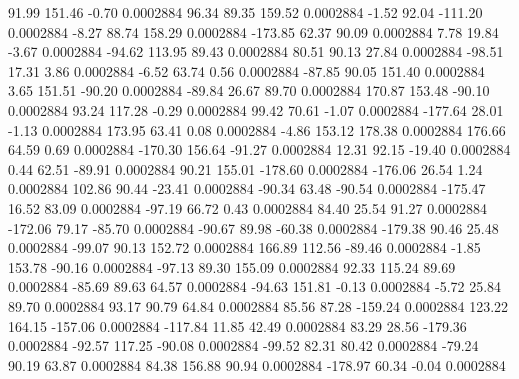        91.99      151.46       -0.70     0.0002884
       96.34       89.35      159.52     0.0002884
       -1.52       92.04     -111.20     0.0002884
       -8.27       88.74      158.29     0.0002884
     -173.85       62.37       90.09     0.0002884
        7.78       19.84       -3.67     0.0002884
      -94.62      113.95       89.43     0.0002884
       80.51       90.13       27.84     0.0002884
      -98.51       17.31        3.86     0.0002884
       -6.52       63.74        0.56     0.0002884
      -87.85       90.05      151.40     0.0002884
        3.65      151.51      -90.20     0.0002884
      -89.84       26.67       89.70     0.0002884
      170.87      153.48      -90.10     0.0002884
       93.24      117.28       -0.29     0.0002884
       99.42       70.61       -1.07     0.0002884
     -177.64       28.01       -1.13     0.0002884
      173.95       63.41        0.08     0.0002884
       -4.86      153.12      178.38     0.0002884
      176.66       64.59        0.69     0.0002884
     -170.30      156.64      -91.27     0.0002884
       12.31       92.15      -19.40     0.0002884
        0.44       62.51      -89.91     0.0002884
       90.21      155.01     -178.60     0.0002884
     -176.06       26.54        1.24     0.0002884
      102.86       90.44      -23.41     0.0002884
      -90.34       63.48      -90.54     0.0002884
     -175.47       16.52       83.09     0.0002884
      -97.19       66.72        0.43     0.0002884
       84.40       25.54       91.27     0.0002884
     -172.06       79.17      -85.70     0.0002884
      -90.67       89.98      -60.38     0.0002884
     -179.38       90.46       25.48     0.0002884
      -99.07       90.13      152.72     0.0002884
      166.89      112.56      -89.46     0.0002884
       -1.85      153.78      -90.16     0.0002884
      -97.13       89.30      155.09     0.0002884
       92.33      115.24       89.69     0.0002884
      -85.69       89.63       64.57     0.0002884
      -94.63      151.81       -0.13     0.0002884
       -5.72       25.84       89.70     0.0002884
       93.17       90.79       64.84     0.0002884
       85.56       87.28     -159.24     0.0002884
      123.22      164.15     -157.06     0.0002884
     -117.84       11.85       42.49     0.0002884
       83.29       28.56     -179.36     0.0002884
      -92.57      117.25      -90.08     0.0002884
      -99.52       82.31       80.42     0.0002884
      -79.24       90.19       63.87     0.0002884
       84.38      156.88       90.94     0.0002884
     -178.97       60.34       -0.04     0.0002884
